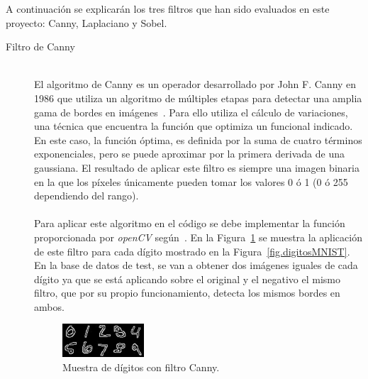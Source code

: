 A continuación se explicarán los tres filtros que han sido evaluados en este proyecto: Canny, Laplaciano y Sobel.

\begin{description}
	\item[Filtro de Canny] \hfill 
	\vspace{5pt}
	\\
	El algoritmo de Canny es un operador desarrollado por John F. Canny en 1986 que utiliza un algoritmo de múltiples etapas para detectar una amplia gama de bordes en imágenes~\cite{4767851}. Para ello utiliza el cálculo de variaciones, una técnica que encuentra la función que optimiza un funcional indicado. En este caso, la función óptima, es definida por la suma de cuatro términos exponenciales, pero se puede aproximar por la primera derivada de una gaussiana. El resultado de aplicar este filtro es siempre una imagen binaria en la que los píxeles únicamente pueden tomar los valores 0 ó 1 (0 ó 255 dependiendo del rango).\\
	\vspace{-10pt}
	\\
	Para aplicar este algoritmo en el código se debe implementar la función proporcionada por \textit{openCV} según~\cite{canny}. En la Figura~\ref{fig.canny} se muestra la aplicación de este filtro para cada dígito mostrado en la Figura~\ref{fig.digitosMNIST}. En la base de datos de test, se van a obtener dos imágenes iguales de cada dígito ya que se está aplicando sobre el original y el negativo el mismo filtro, que por su propio funcionamiento, detecta los mismos bordes en ambos.
	
	\begin{figure}[H]
		\begin{center}
			\includegraphics[width=0.3\textwidth]{figures/canny}
			\caption{Muestra de dígitos con filtro Canny.}
			\label{fig.canny}
		\end{center}
	\end{figure}
	

\end{description}
